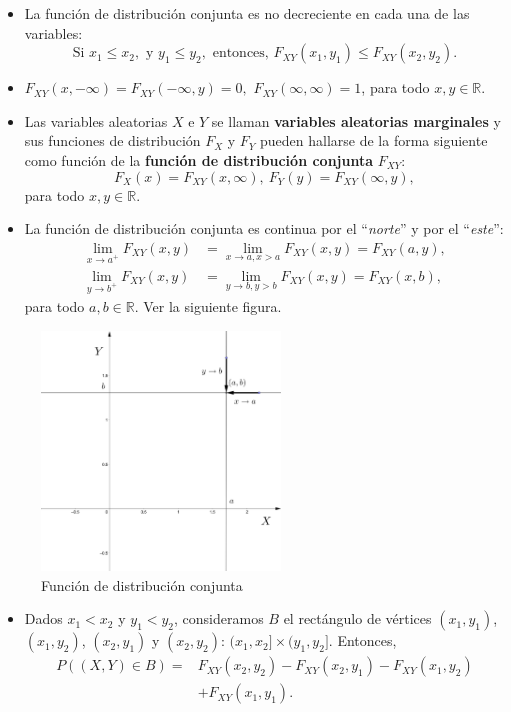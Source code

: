\documentclass[
  letterpaper,
  DIV=11,
  numbers=noendperiod]{scrreprt}
\providecommand{\tightlist}{%
  \setlength{\itemsep}{0pt}\setlength{\parskip}{0pt}}\usepackage{longtable,booktabs,array}
\begin{document}
\begin{itemize}
\item
  La función de distribución conjunta es no decreciente en cada una de
  las variables: \[
  \mbox{Si }x_1\leq x_2, \mbox{ y }y_1\leq y_2,\mbox{ entonces, }F_{XY}(x_1,y_1)\leq F_{XY}(x_2,y_2).
  \]
\item
  \(F_{XY}(x,-\infty)=F_{XY}(-\infty,y)=0,\)
  \(F_{XY}(\infty,\infty)=1\), para todo \(x,y\in\mathbb{R}\).
\item
  Las variables aleatorias \(X\) e \(Y\) se llaman \textbf{variables
  aleatorias marginales} y sus funciones de distribución \(F_X\) y
  \(F_Y\) pueden hallarse de la forma siguiente como función de la
  \textbf{función de distribución conjunta} \(F_{XY}\): \[
  F_X(x)=F_{XY}(x,\infty),\ F_Y(y)=F_{XY}(\infty,y),
  \] para todo \(x,y\in\mathbb{R}\).
\item
  La función de distribución conjunta es continua por el
  ``\emph{norte}'' y por el ``\emph{este}'': \[
  \begin{array}{rl}
  \lim_{x\to a^+}F_{XY}(x,y) & =\lim_{x\to a, x> a}F_{XY}(x,y)=F_{XY}(a,y), \\
  \lim_{y\to b^+}F_{XY}(x,y) & =\lim_{y\to b, y> b}F_{XY}(x,y)=F_{XY}(x,b),
  \end{array}
  \] para todo \(a,b\in\mathbb{R}\). Ver la siguiente figura.
\end{itemize}

\begin{figure}

{\centering \includegraphics[width=2.5in,height=\textheight]{Images/Fxy2.png}

}

\caption{Función de distribución conjunta}

\end{figure}

\begin{itemize}
\tightlist
\item
  Dados \(x_1<x_2\) y \(y_1<y_2\), consideramos \(B\) el rectángulo de
  vértices \((x_1,y_1)\), \((x_1,y_2)\), \((x_2,y_1)\) y \((x_2,y_2)\):
  \((x_1,x_2]\times (y_1,y_2]\). Entonces, \[
  \begin{array}{rl}
  P((X,Y)\in B)  = & F_{XY}(x_2,y_2)-F_{XY}(x_2,y_1)-F_{XY}(x_1,y_2)\\ & +F_{XY}(x_1,y_1).
  \end{array}
  \]
\end{itemize}
\end{document}
